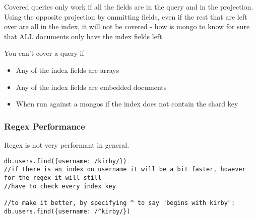 \documentclass[11pt]{article}
\begin{document}
Covered queries only work if all the fields are in the query and in the projection. Using the opposite projection by ommitting fields, even if the rest that are left over are all in the index,
it will not be covered - how is mongo to know for sure that ALL documents only have the index fields left.

You can't cover a query if
\begin{itemize}
\item Any of the index fields are arrays
\item Any of the index fields are embedded documents
\item When run against a mongos if the index does not contain the shard key
\end{itemize}

\subsubsection{Regex Performance}
\label{sec:orgd55db12}
Regex is not very performant in general.

\begin{verbatim}
db.users.find({username: /kirby/})
//if there is an index on username it will be a bit faster, however for the regex it will still
//have to check every index key

//to make it better, by specifying ^ to say "begins with kirby":
db.users.find({username: /^kirby/})

\end{verbatim}
\end{document}
